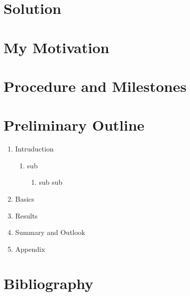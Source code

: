\documentclass[a4paper,oneside,11pt]{article}
\begin{document}
\section{Solution}


\section{My Motivation}


\section{Procedure and Milestones}


\section{Preliminary Outline}

\begin{enumerate}
\item Intruduction
	\begin{enumerate}
	\item sub
		\begin{enumerate}
		\item sub sub
		\end{enumerate}
	\end{enumerate}

\item Basics
\item Results
\item Summary and Outlook
\item Appendix

\end{enumerate}

\section*{Bibliography}
\end{document}
